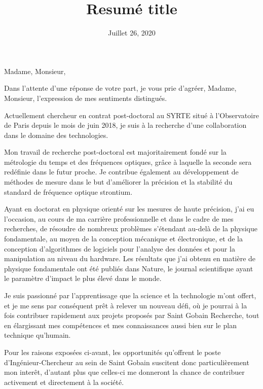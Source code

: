 \documentclass[12pt,a4paper,sans]{moderncv}        %
\title{Resumé title}                               %
\begin{document}
\date{Juillet 26, 2020}
\opening{Madame, Monsieur,}
\closing{Dans l’attente d’une réponse de votre part, je vous prie d’agréer, Madame, Monsieur, l’expression de mes sentiments distingués.}
\makelettertitle
\justifying

Actuellement chercheur en contrat post-doctoral au SYRTE situé à l'Observatoire de Paris depuis le mois de juin 2018, je suis à la recherche d’une collaboration dans le domaine des technologies.

Mon travail de recherche post-doctoral est majoritairement fondé sur la métrologie du temps et des fréquences optiques, grâce à laquelle la seconde sera redéfinie dans le futur proche. Je  contribue également au développement de méthodes de mesure dans le but d’améliorer la précision et la stabilité du standard de fréquence optique strontium.

Ayant en doctorat en physique orienté sur les mesures de haute précision, j’ai eu l’occasion, au cours de ma carrière professionnelle et dans le cadre de mes recherches, de résoudre de nombreux problèmes s’étendant au-delà de la physique fondamentale, au moyen de la conception mécanique et électronique, et de la conception d’algorithmes de logiciels pour l'analyse des données et pour la manipulation au niveau du hardware. Les résultats que j’ai obtenu en matière de physique fondamentale ont été publiés dans Nature, le journal scientifique ayant le paramètre d'impact le plus élevé dans le monde.  

Je suis passionné par l'apprentissage que la science et la technologie m'ont offert, et je me sens par conséquent prêt à relever un nouveau défi, où je pourrai à la fois contribuer rapidement aux projets proposés par Saint Gobain Recherche, tout en élargissant mes compétences et mes connaissances aussi bien sur le plan technique qu’humain. 

Pour les raisons exposées ci-avant, les opportunités qu’offrent le poste d’Ingénieur-Chercheur au sein de Saint Gobain suscitent donc particulièrement mon interêt, d’autant plus que celles-ci me donneront la chance de contribuer activement et directement à la société.
\end{document}
